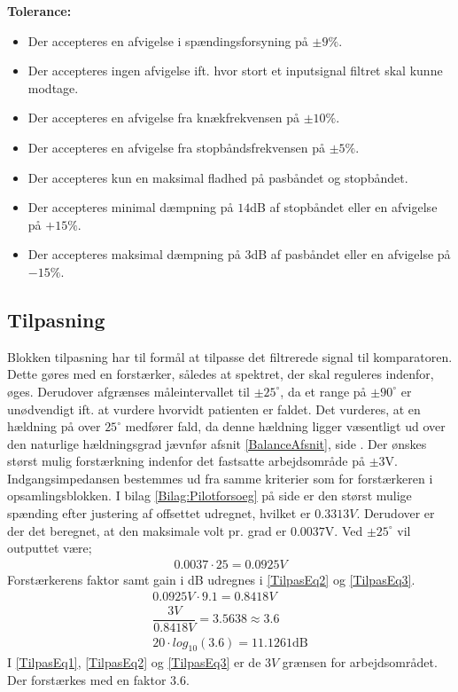 \noindent \textbf{Tolerance:}
\begin{itemize}
	\item Der accepteres en afvigelse i spændingsforsyning på $\pm9\%$.
	\item Der accepteres ingen afvigelse ift. hvor stort et inputsignal filtret skal kunne modtage.
	\item Der accepteres en afvigelse fra knækfrekvensen på $\pm10\%$.
	\item Der accepteres en afvigelse fra stopbåndsfrekvensen på $\pm5\%$.
	\item Der accepteres kun en maksimal fladhed på pasbåndet og stopbåndet.
	\item Der accepteres minimal dæmpning på $14$dB af stopbåndet eller en afvigelse på $+15\%$.
	\item Der accepteres maksimal dæmpning på $3$dB af pasbåndet eller en afvigelse på $-15\%$.
\end{itemize}
\subsection{Tilpasning}\label{Tilpasningsblok}
Blokken tilpasning har til formål at tilpasse det filtrerede signal til komparatoren. Dette gøres med en forstærker, således at spektret, der skal reguleres indenfor, øges. Derudover afgrænses måleintervallet til $\pm25^{\circ}$, da et range på $\pm90^{\circ}$ er unødvendigt ift. at vurdere hvorvidt patienten er faldet. Det vurderes, at en hældning på over $25^{\circ}$ medfører fald, da denne hældning ligger væsentligt ud over den naturlige hældningsgrad jævnfør afsnit \ref{BalanceAfsnit}, side \pageref{BalanceAfsnit}. Der ønskes størst mulig forstærkning indenfor det fastsatte arbejdsområde på $\pm3$V. Indgangsimpedansen bestemmes ud fra samme kriterier som for forstærkeren i opsamlingsblokken. I bilag \ref{Bilag:Pilotforsoeg} på side \pageref{Bilag:Pilotforsoeg} er den størst mulige spænding efter justering af offsettet udregnet, hvilket er $0.3313V$. Derudover er der det beregnet, at den maksimale volt pr. grad er $0.0037$V. Ved $\pm25^{\circ}$ vil outputtet være;
\begin{align}
\label{Udreg3} 0.0037 \cdot 25 = 0.0925V
\end{align}
Forstærkerens faktor samt gain i dB udregnes i \eqref{TilpasEq2} og \eqref{TilpasEq3}.
\begin{align}
\label{TilpasEq1} 0.0925V \cdot 9.1 = 0.8418V \\
\label{TilpasEq2} \dfrac{3V}{0.8418V} = 3.5638 \approx 3.6 \\
\label{TilpasEq3} 20 \cdot log_{10} (3.6) = 11.1261\text{dB}
\end{align} 
I \eqref{TilpasEq1}, \eqref{TilpasEq2} og \eqref{TilpasEq3} er de $3V$ grænsen for arbejdsområdet. Der forstærkes med en faktor $3.6$. \\

